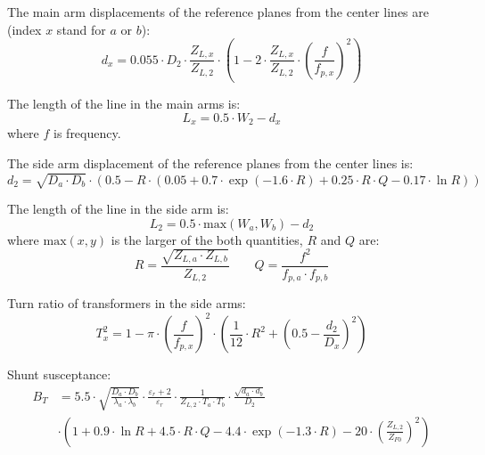 The main arm displacements of the reference planes from the center
lines are (index $x$ stand for $a$ or $b$):
\begin{equation}
d_x = 0.055\cdot D_2\cdot \frac{Z_{L,x}}{Z_{L,2}}\cdot
      \left( 1 - 2\cdot\frac{Z_{L,x}}{Z_{L,2}}\cdot \left( \frac{f}{f_{p,x}} \right)^2 \right)
\end{equation}

The length of the line in the main arms is:
\begin{equation}
L_x = 0.5\cdot W_2 - d_x
\end{equation}
where $f$ is frequency.

\addvspace{12pt}

The side arm displacement of the reference planes from the center
lines is:
\begin{equation}
d_2 = \sqrt{D_a \cdot D_b}\cdot \left( 0.5 - R\cdot
      \left( 0.05 + 0.7\cdot\exp\left(-1.6\cdot R\right) + 0.25\cdot R\cdot Q - 0.17\cdot \ln R \right) \right)
\end{equation}

The length of the line in the side arm is:
\begin{equation}
L_2 = 0.5\cdot \text{max}\left(W_a, W_b\right) - d_2
\end{equation}
where $\text{max}\left(x, y\right)$ is the larger of the both
quantities, $R$ and $Q$ are:
\begin{equation}
R = \frac{\sqrt{Z_{L,a}\cdot Z_{L,b}}}{Z_{L,2}} \qquad Q = \frac{f^2}{f_{p,a}\cdot f_{p,b}}
\end{equation}

Turn ratio of transformers in the side arms:
\begin{equation}
T_x^2 = 1 - \pi\cdot \left( \frac{f}{f_{p,x}} \right)^2 \cdot \left( \frac{1}{12}\cdot R^2
        + \left( 0.5 - \frac{d_2}{D_x} \right)^2 \right)
\end{equation}

Shunt susceptance:
\begin{equation}
\begin{split}
B_T &= 5.5\cdot \sqrt{\frac{D_a\cdot D_b}{\lambda_a\cdot \lambda_b}}\cdot \frac{\varepsilon_r+2}{\varepsilon_r}
      \cdot \frac{1}{Z_{L,2}\cdot T_a\cdot T_b}\cdot \frac{\sqrt{d_a\cdot d_b}}{D_2} \\
   &  \cdot \left( 1+0.9\cdot\ln R +4.5\cdot R\cdot Q
       -4.4\cdot\exp\left(-1.3\cdot R\right) -20\cdot \left( \frac{Z_{L,2}}{Z_{F0}} \right)^2 \right)
\end{split}
\end{equation}


